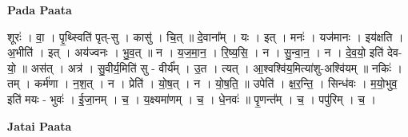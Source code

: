 \documentclass[17pt]{extarticle}
\begin{document}
\textbf{Pada Paata} \newline

शूरः॑ । वा॒ । पृ॒थ्स्विति॑ पृत्-सु । कासु॑ । चि॒त् ॥ दे॒वाना᳚म् । यः । इत् । मनः॑ । यज॑मानः । इय॑क्षति । अ॒भीति॑ । इत् । अय॑ज्वनः । भु॒व॒त् ॥ न । य॒ज॒मा॒न॒ । रि॒ष्य॒सि॒ । न । सु॒न्वा॒न॒ । न । दे॒व॒यो॒ इति॑ देव-यो॒ ॥ अस॑त् । अत्र॑ । सु॒वीर्य॒मिति॑ सु - वीर्य᳚म् । उ॒त । त्यत् । आ॒श्वश्वि॑य॒मित्या॑शु-अश्वि॑यम् ॥ नकिः॑ । तम् । कर्म॑णा । न॒श॒त् । न । प्रेति॑ । यो॒ष॒त् । न । यो॒ष॒ति॒ ॥ उपेति॑ । क्ष॒र॒न्ति॒ । सिन्ध॑वः । म॒यो॒भुव॒ इति॑ मयः - भुवः॑ । ई॒जा॒नम् । च॒ । य॒क्ष्यमा॑णम् । च॒ । धे॒नवः॑ ॥ पृ॒णन्त᳚म् । च॒ । पपु॑रिम् । च॒ ।  \newline



\textbf{Jatai Paata} \newline
\end{document}
